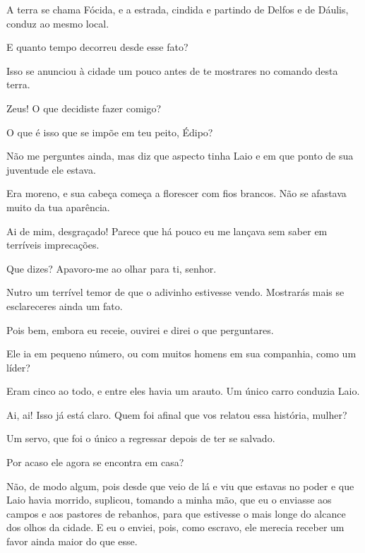    A terra se chama Fócida, e a estrada, cindida e partindo de Delfos e de
Dáulis, conduz ao mesmo local.

   E quanto tempo decorreu desde esse fato?

   Isso se anunciou à cidade um pouco antes de te mostrares no comando
desta terra.

   Zeus! O que decidiste fazer comigo?

   O que é isso que se impõe em teu peito, Édipo?

   Não me perguntes  ainda, mas diz que aspecto tinha Laio e em que
ponto de sua juventude ele estava.

   Era moreno, e sua cabeça começa a florescer com fios brancos. Não se
afastava muito da tua aparência.

   Ai de mim, desgraçado! Parece que há pouco eu me lançava sem saber em
terríveis imprecações.

   Que dizes? Apavoro-me ao olhar para ti, senhor.

   Nutro um terrível temor de que o adivinho estivesse vendo. Mostrarás
mais se esclareceres ainda um fato.

   Pois bem, embora eu receie, ouvirei e direi o que perguntares.

   Ele ia em pequeno  número, ou com muitos homens em sua companhia,
como um líder?

   Eram cinco ao todo, e entre eles havia um arauto. Um único carro
conduzia Laio.

   Ai, ai! Isso já está claro. Quem foi afinal que vos relatou essa
história, mulher?

   Um servo, que foi o único a regressar depois de ter se salvado.

   Por acaso ele agora se encontra em casa?

   Não, de modo algum, pois desde que veio de lá e viu que estavas no poder
e que Laio havia morrido, suplicou, tomando a minha mão, que eu o
enviasse aos campos e aos pastores de rebanhos, para que estivesse o
mais longe do alcance dos olhos da cidade. E eu o enviei, pois, como
escravo, ele merecia receber um favor ainda maior do que esse.

